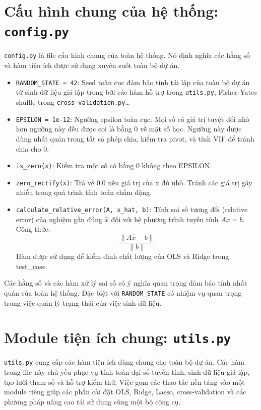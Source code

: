 \documentclass[12pt,a4paper]{report}
\begin{document}
\section{Cấu hình chung của hệ thống: \texttt{config.py}}

\texttt{config.py} là file cấu hình chung của toàn hệ thống. Nó định nghĩa các hằng số và hàm tiện ích được sử dụng xuyên suốt toàn bộ dự án.

\begin{itemize}
  \item \texttt{RANDOM\_STATE = 42}: Seed toàn cục đảm bảo tính tái lập của toàn bộ dự án từ sinh dữ liệu giả lập trong bởi các hàm hỗ trợ trong \texttt{utils.py}, Fisher-Yates shuffle trong \texttt{cross\_validation.py}\ldots
  \item \texttt{EPSILON = 1e-12}: Ngưỡng epsilon toàn cục. Mọi số có giá trị tuyệt đối nhỏ hơn ngưỡng này đều được coi là bằng 0 về mặt số học. Ngưỡng này được dùng nhất quán trong tất cả phép chia, kiểm tra pivot, và tính VIF để tránh chia cho 0.
  \item \texttt{is\_zero(x)}: Kiểm tra một số có bằng 0 không theo EPSILON.
  \item \texttt{zero\_rectify(x)}: Trả về 0.0 nếu giá trị của x đủ nhỏ. Tránh các giá trị gây nhiễu trong quá trình tính toán chấm động.
  \item \texttt{calculate\_relative\_error(A, x\_hat, b)}: Tính sai số tương đối (relative error) của nghiệm gần đúng $\hat{x}$ đối với hệ phương trình tuyến tính $A x = b$. Công thức:
    \[
    \frac{\|A \hat{x} - b\|}{\|b\|}
    \]
    Hàm được sử dụng để kiểm định chất lượng của OLS và Ridge trong test\_case.
\end{itemize}
Các hằng số và các hàm xử lý sai số có ý nghĩa quan trọng đảm bảo tính nhất quán của toàn hệ thống. Đặc biệt với \texttt{RANDOM\_STATE} có nhiệm vụ quan trọng trong việc quản lý trạng thái của việc sinh dữ liệu.

\section{Module tiện ích chung: \texttt{utils.py}}
\texttt{utils.py} cung cấp các hàm tiện ích dùng chung cho toàn bộ dự án. Các hàm trong file này chủ yếu phục vụ tính toán đại số tuyến tính, sinh dữ liệu giả lập, tạo lưới tham số và hỗ trợ kiểm thử. Việc gom các thao tác nền tảng vào một module riêng giúp các phần cài đặt OLS, Ridge, Lasso, cross-validation và các phương pháp nâng cao tái sử dụng cùng một bộ công cụ.
\end{document}
